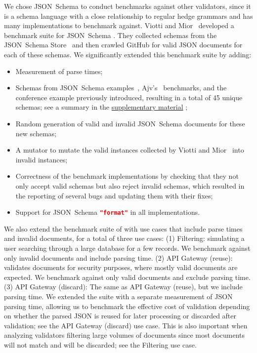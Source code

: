 \documentclass[runningheads]{llncs}
\newcommand{\JSONSchema}{%
  JSON~Schema\xspace%
}
\newcommand{\supplementarymaterial}{%
  \hyperref[supplementary_material]{supplementary material}\xspace%
}
\newcommand{\GitHub}{%
  GitHub\xspace%
}
\newcommand{\format}{%
  \lstinline[language=json]|"format"|\xspace%
}
\newcommand{\JSON}{\ac{JSON}\xspace}
\begin{document}
We chose \JSONSchema to conduct benchmarks against other validators, since it is a schema language with a close relationship to regular hedge grammars and has many implementations to benchmark against.
Viotti and Mior~\cite{blaze} developed a benchmark suite for \JSONSchema.
They collected schemas from the \JSONSchema Store~\cite{schemastore} and then crawled \GitHub for valid \JSON documents for each of these schemas.
We significantly extended this benchmark suite by adding:
\begin{itemize}
\item Measurement of parse times;
\item Schemas from \JSONSchema examples~\cite{jsonschemaexamples}, Ajv's~\cite{jsonschema_impl_ajv} benchmarks, and the conference example previously introduced, resulting in a total of 45 unique schemas; see a summary in the \supplementarymaterial;
\item Random generation of valid and invalid \JSONSchema documents for these new schemas;
\item A mutator to mutate the valid instances collected by Viotti and Mior~\cite{blaze} into invalid instances;
\item Correctness of the benchmark implementations by checking that they not only accept valid schemas but also reject invalid schemas, which resulted in the reporting of several bugs and updating them with their fixes;
\item Support for \JSONSchema \format in all implementations.
\end{itemize}
We also extend the benchmark suite of \cite{blaze} with use cases that include parse times and invalid documents, for a total of three use cases: (1) Filtering: simulating a user searching through a large database for a few records. We benchmark against only invalid documents and include parsing time.
(2) API Gateway (reuse): validates documents for security purposes, where mostly valid documents are expected. We benchmark against only valid documents and exclude parsing time.
(3) API Gateway (discard): The same as API Gateway (reuse), but we include parsing time.
We extended the suite with a separate measurement of \JSON parsing time, allowing us to benchmark the effective cost of validation depending on whether the parsed \JSON is reused for later processing or discarded after validation; see the API Gateway (discard) use case.
This is also important when analyzing validators filtering large volumes of documents since most documents will not match and will be discarded; see the Filtering use case. 
\end{document}
